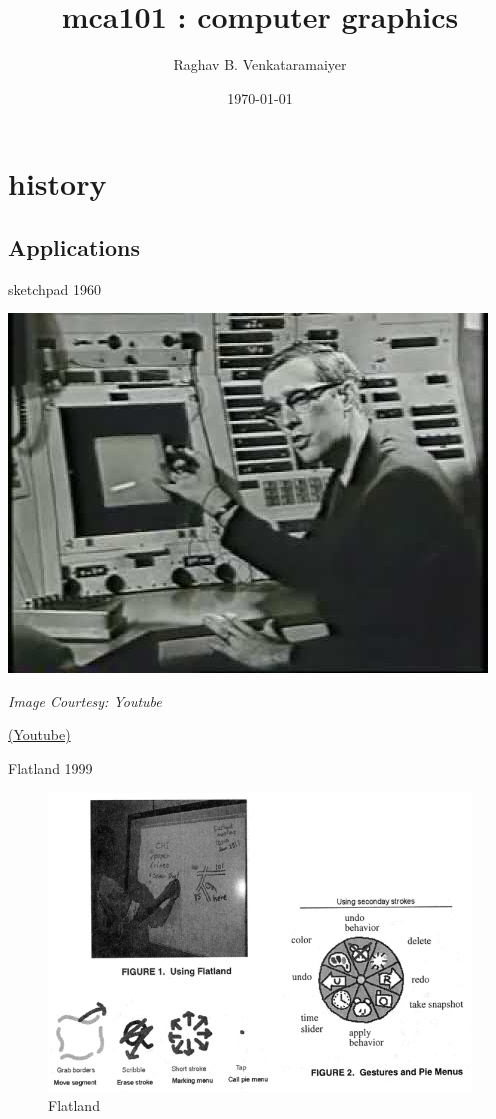\documentclass[aspectratio=169,xcolor={dvipsnames,svgnames}]{beamer}
\date{}
\title{mca101 : computer graphics}
\author{%
\normalsize Raghav B. Venkataramaiyer
}
\institute{%
CSED TIET Patiala India.
}
\date{\scriptsize \today}
\begin{document}
\maketitle


\section{history}
\label{sec:org5ec43fa}

\subsection{Applications}
\label{sec:orgdec1ac4}

\begin{frame}[label={sec:orgd41ff06}]{sketchpad 1960}
\centering

\begin{center}
\includegraphics[width=0.5\linewidth]{images/sutherland-sketchpad.jpg}
\end{center}
\emph{Image Courtesy: Youtube}

\href{https://www.youtube.com/watch?v=ztRtFEwyXnY}{(Youtube)}
\end{frame}

\begin{frame}[label={sec:org53d404f}]{Flatland 1999}
\begin{figure}[htbp]
\centering
\includegraphics[width=0.6\linewidth]{images/flatland-1999.png}
\caption{Flatland \cite{MIEL99}}
\end{figure}
\end{frame}
\end{document}
